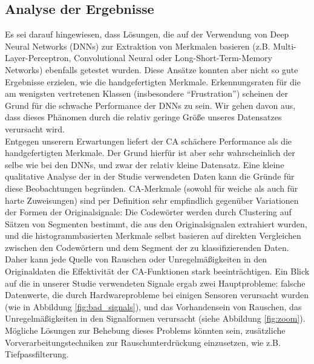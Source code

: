 \subsection{Analyse der Ergebnisse} \label{analyse-subsec}


Es sei darauf hingewiesen, dass Lösungen, die auf der Verwendung von Deep Neural Networks (DNNs) zur Extraktion von Merkmalen basieren (z.B. Multi-Layer-Perceptron, Convolutional Neural oder Long-Short-Term-Memory Networks) ebenfalls getestet wurden. Diese Ansätze konnten aber nicht so gute Ergebnisse erzielen, wie die handgefertigten Merkmale. Erkennungsraten für die am wenigsten vertretenen Klassen (insbesondere ``Frustration'') scheinen der Grund für die schwache Performance der DNNs zu sein. Wir gehen davon aus, dass dieses Phänomen durch die relativ geringe Größe unseres Datensatzes verursacht wird. \\

Entgegen unserern Erwartungen liefert der CA schächere Performance als die handgefertigten Merkmale. Der Grund hierfür ist aber sehr wahrscheinlich der selbe wie bei den  DNNs, und zwar der relativ kleine Datensatz. 
Eine kleine qualitative Analyse der in der Studie verwendeten Daten kann die Gründe für diese Beobachtungen begründen. 
CA-Merkmale (sowohl für weiche als auch für harte Zuweisungen) sind per Definition sehr empfindlich gegenüber Variationen der Formen der Originalsignale: Die Codewörter werden durch Clustering auf Sätzen von Segmenten bestimmt, die aus den Originalsignalen extrahiert wurden, und die histogrammbasierten Merkmale selbst basieren auf direkten Vergleichen zwischen den Codewörtern und dem Segment der zu klassifizierenden Daten. 
Daher kann jede Quelle von Rauschen oder Unregelmäßigkeiten in den Originaldaten die Effektivität der CA-Funktionen stark beeinträchtigen. 
Ein Blick auf die in unserer Studie verwendeten Signale ergab zwei Hauptprobleme: falsche Datenwerte, die durch Hardwareprobleme bei einigen Sensoren verursacht wurden (wie in Abbildung \ref{fig:bad_signals}), und das Vorhandensein von Rauschen, das Unregelmäßigkeiten in den Signalformen verursacht (siehe Abbildung \ref{fig:zoom}). Mögliche Lösungen zur Behebung dieses Problems könnten sein, zusätzliche Vorverarbeitungstechniken zur Rauschunterdrückung einzusetzen, wie z.B. Tiefpassfilterung. \\


